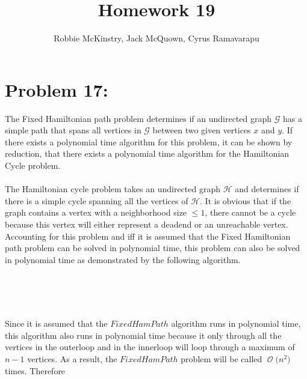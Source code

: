 \documentclass[12pt]{article}
\newcommand{\BigO}[1]{\ensuremath{\operatorname{\mathcal{O}}\bigl(#1\bigr)}}
\begin{document}
\title{Homework 19}
\author{Robbie McKinstry, Jack McQuown, Cyrus Ramavarapu}
\renewcommand{\today}{17 October 2016}
\renewcommand{\baselinestretch}{1.5}
\maketitle

\section*{Problem 17: }
The Fixed Hamiltonian path problem determines if an undirected graph
$\mathcal{G}$ has a simple path that spans all vertices in $\mathcal{G}$
between two given vertices $x$ and $y$.  If there exists a polynomial
time algorithm for this problem, it can be shown by reduction, that
there exists a polynomial time algorithm for the Hamiltonian Cycle
problem.\\\\
The Hamiltonian cycle problem takes an undirected graph $\mathcal{H}$
and determines if there is a simple cycle spanning all the vertices
of $\mathcal{H}$.  It is obvious that if the graph contains a vertex
with a neighborhood size $\leq 1$, there cannot be a cycle because this
vertex will either represent a deadend or an unreachable vertex.  
Accounting for this problem and iff it is assumed that the Fixed
Hamiltonian path problem can be solved in polynomial time, this
problem can also be solved in polynomial time as demonstrated
by the following algorithm.\\\\ 
\begin{algorithm}[H]
\\
\\
{
{}
}
{
{
{}
}
}
\end{algorithm}
Since it is assumed that the $FixedHamPath$ algorithm runs
in polynomial time, this algorithm also runs in polynomial time because
it only through all the vertices in the outerloop and in the innerloop
will loop through a maximum of $n-1$ vertices.  As a result, the
$FixedHamPath$ problem will be called \BigO{n^2} times.  Therefore
\end{document}

